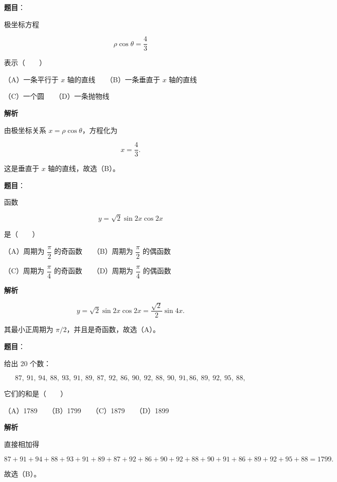 \begin{answer}

\textbf{题目}：

极坐标方程

\nopagebreak[4]
\[
\rho\cos\theta=\frac43
\]

表示\mbox{（　　）}

（A）一条平行于 $x$ 轴的直线　　（B）一条垂直于 $x$ 轴的直线

（C）一个圆　　（D）一条抛物线

\textbf{解析}

由极坐标关系 $x=\rho\cos\theta$，方程化为

\nopagebreak[4]
\[
x=\frac43.
\]

这是垂直于 $x$ 轴的直线，故选（B）。


\end{answer}
\begin{answer}

\textbf{题目}：

函数

\nopagebreak[4]
\[
y=\sqrt2\sin2x\cos2x
\]

是\mbox{（　　）}

（A）周期为 $\dfrac\pi2$ 的奇函数　　（B）周期为 $\dfrac\pi2$ 的偶函数

（C）周期为 $\dfrac\pi4$ 的奇函数　　（D）周期为 $\dfrac\pi4$ 的偶函数

\textbf{解析}

\nopagebreak[4]
\[
y=\sqrt2\sin2x\cos2x=\frac{\sqrt2}{2}\sin4x.
\]

其最小正周期为 $\pi/2$，并且是奇函数，故选（A）。


\end{answer}
\begin{answer}

\textbf{题目}：

给出 20 个数：

\nopagebreak[4]
\[
87,\ 91,\ 94,\ 88,\ 93,\ 91,\ 89,\ 87,\ 92,\ 86,\ 90,\ 92,\ 88,\ 90,\ 91,
86,\ 89,\ 92,\ 95,\ 88,
\]

它们的和是\mbox{（　　）}

（A）1789　　（B）1799　　（C）1879　　（D）1899

\textbf{解析}

直接相加得

\nopagebreak[4]
\[
87+91+94+88+93+91+89+87+92+86
+90+92+88+90+91+86+89+92+95+88=1799.
\]

故选（B）。


\end{answer}
